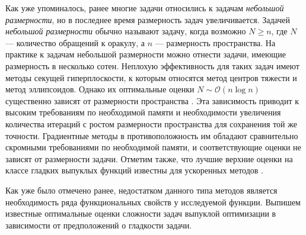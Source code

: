Как уже упоминалось, ранее многие задачи относились к задачам \textit{небольшой размерности}, но в последнее время размерность задач увеличивается. Задачей \textit{небольшой размерности} обычно называют задачу, когда возможно $N \geq n$, где $N$ --- количество обращений к оракулу, а $n$ --- размерность пространства. На практике к задачам небольшой размерности можно отнести задачи, имеющие размерность в несколько сотен. Неплохую эффективность для таких задач имеют методы секущей гиперплоскости, к которым относятся метод центров тяжести и метод эллипсоидов. Однако их оптимальные оценки $N \sim \mathcal{O}\left(n \log{n}\right)$ существенно зависят от размерности пространства \cite{bubeck_2015}. 
Эта зависимость приводит к высоким требованиям по необходимой памяти и необходимости увеличения количества итераций с ростом размерности пространства для сохранения той же точности. Градиентные методы в противоположность им обладают сравнительно скромными требованиями по необходимой памяти, и соответствующие оценки не зависят от размерности задачи. Отметим также, что лучшие верхние оценки на классе гладких выпуклых функций известны для ускоренных методов \cite{Nesterov1983}.

Как уже было отмечено ранее, недостатком данного типа методов является необходимость ряда функциональных свойств у исследуемой функции. Выпишем известные оптимальные оценки сложности задач выпуклой оптимизации в зависимости от предположений о гладкости задачи.

